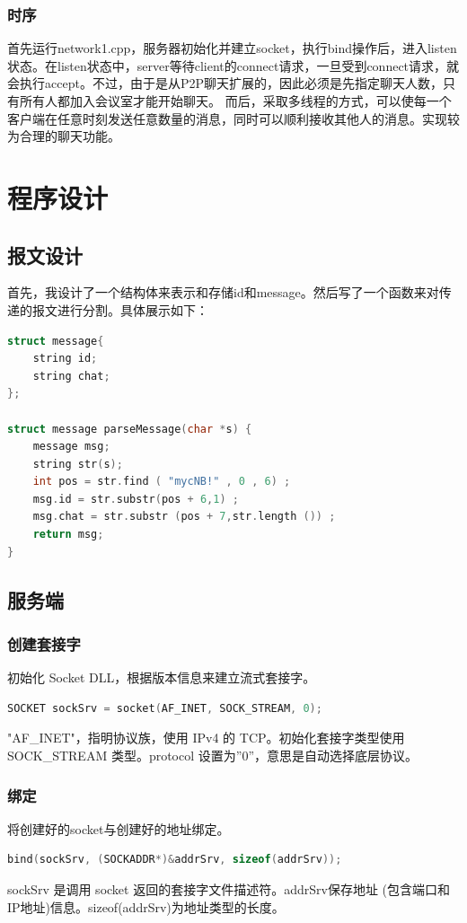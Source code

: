 \documentclass[UTF8,a4paper,10pt]{ctexart}
\begin{document}
\subsubsection{时序}
首先运行network1.cpp，服务器初始化并建立socket，执行bind操作后，进入listen状态。在listen状态中，server等待client的connect请求，一旦受到connect请求，就会执行accept。不过，由于是从P2P聊天扩展的，因此必须是先指定聊天人数，只有所有人都加入会议室才能开始聊天。
而后，采取多线程的方式，可以使每一个客户端在任意时刻发送任意数量的消息，同时可以顺利接收其他人的消息。实现较为合理的聊天功能。

\section{程序设计}
\subsection{报文设计}
首先，我设计了一个结构体来表示和存储id和message。然后写了一个函数来对传递的报文进行分割。具体展示如下：
\begin{lstlisting}[frame=trbl,language={C++}]
struct message{
    string id;
    string chat;
};

struct message parseMessage(char *s) {
    message msg;
    string str(s);
    int pos = str.find ( "mycNB!" , 0 , 6) ;
    msg.id = str.substr(pos + 6,1) ;
    msg.chat = str.substr (pos + 7,str.length ()) ;
    return msg;
}
\end{lstlisting}
\subsection{服务端}
\subsubsection{创建套接字}
初始化 Socket DLL，根据版本信息来建立流式套接字。
\begin{lstlisting}[frame=trbl,language={C++}]
SOCKET sockSrv = socket(AF_INET, SOCK_STREAM, 0);
\end{lstlisting}
"AF\_INET"，指明协议族，使用 IPv4 的 TCP。初始化套接字类型使用 SOCK\_STREAM 类型。protocol 设置为”0”，意思是自动选择底层协议。
\subsubsection{绑定}
将创建好的socket与创建好的地址绑定。
\begin{lstlisting}[frame=trbl,language={C++}]
bind(sockSrv, (SOCKADDR*)&addrSrv, sizeof(addrSrv));
\end{lstlisting}
sockSrv 是调用 socket 返回的套接字文件描述符。addrSrv保存地址 (包含端口和IP地址)信息。sizeof(addrSrv)为地址类型的长度。
\end{document}
